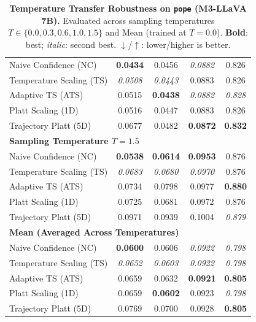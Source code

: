 \begin{table}[t]
{\begin{tabular}{lcccc}
\midrule
Naive Confidence (NC) & \textbf{0.0434} & 0.0456 & \textit{0.0882} & 0.826 \\
Temperature Scaling (TS) & \textit{0.0508} & \textit{0.0443} & 0.0883 & 0.826 \\
Adaptive TS (ATS) & 0.0515 & \textbf{0.0438} & \textit{0.0882} & \textit{0.828} \\
Platt Scaling (1D) & 0.0516 & 0.0447 & 0.0883 & 0.826 \\
Trajectory Platt (5D) & 0.0677 & 0.0482 & \textbf{0.0872} & \textbf{0.832} \\
\midrule
\multicolumn{5}{l}{\textbf{Sampling Temperature $T = 1.5$}} \\
\midrule
Naive Confidence (NC) & \textbf{0.0538} & \textbf{0.0614} & \textbf{0.0953} & 0.876 \\
Temperature Scaling (TS) & \textit{0.0683} & \textit{0.0680} & \textit{0.0970} & 0.876 \\
Adaptive TS (ATS) & 0.0734 & 0.0798 & 0.0977 & \textbf{0.880} \\
Platt Scaling (1D) & 0.0725 & 0.0681 & 0.0972 & 0.876 \\
Trajectory Platt (5D) & 0.0971 & 0.0939 & 0.1004 & \textit{0.879} \\
\midrule
\multicolumn{5}{l}{\textbf{Mean (Averaged Across Temperatures)}} \\
\midrule
Naive Confidence (NC) & \textbf{0.0600} & 0.0606 & \textit{0.0922} & \textit{0.798} \\
Temperature Scaling (TS) & \textit{0.0652} & \textit{0.0603} & \textit{0.0922} & \textit{0.798} \\
Adaptive TS (ATS) & 0.0659 & 0.0632 & \textbf{0.0921} & \textbf{0.805} \\
Platt Scaling (1D) & 0.0659 & \textbf{0.0602} & 0.0923 & \textit{0.798} \\
Trajectory Platt (5D) & 0.0769 & 0.0700 & 0.0928 & \textbf{0.805} \\
\bottomrule
\end{tabular}%
}
\caption{\textbf{Temperature Transfer Robustness on \texttt{pope} (M3-LLaVA 7B).} Evaluated across sampling temperatures $T \in \{0.0, 0.3, 0.6, 1.0, 1.5\}$ and Mean (trained at $T=0.0$). \textbf{Bold}: best; \textit{italic}: second best. $\downarrow$/$\uparrow$: lower/higher is better.}
\label{tab:temp_transfer_m3_pope}
\end{table}

